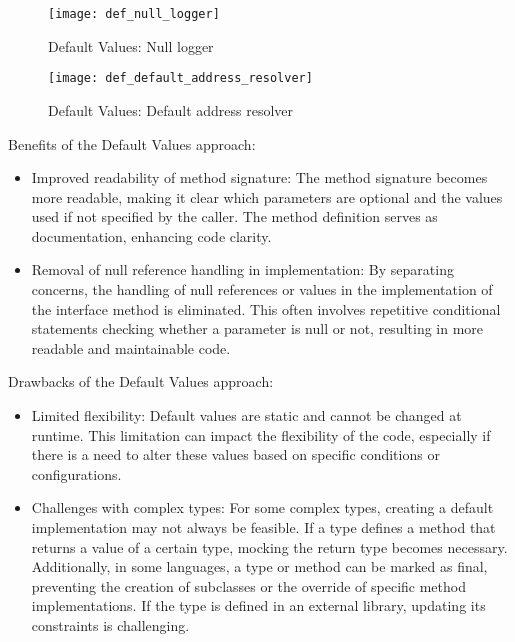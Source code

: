 \begin{figure}[!htb]
    \centering
    \texttt{[image: def\_null\_logger]}
    \caption{Default Values: Null logger}
    \label{fig:def_null_logger}
\end{figure}

\begin{figure}[!htb]
    \centering
    \texttt{[image: def\_default\_address\_resolver]}
    \caption{Default Values: Default address resolver}
    \label{fig:def_default_address_resolver}
\end{figure}

Benefits of the Default Values approach:

\begin{itemize}
    \item Improved readability of method signature:
    The method signature becomes more readable, making it clear which parameters are optional and the values
    used if not specified by the caller.
    The method definition serves as documentation, enhancing code clarity.
    \item Removal of null reference handling in implementation:
    By separating concerns, the handling of null references or values in the implementation of the interface method
    is eliminated.
    This often involves repetitive conditional statements checking whether a parameter is null or not,
    resulting in more readable and maintainable code.
\end{itemize}

Drawbacks of the Default Values approach:

\begin{itemize}
    \item Limited flexibility:
    Default values are static and cannot be changed at runtime.
    This limitation can impact the flexibility of the code, especially if there is a need to alter these values
    based on specific conditions or configurations.
    \item Challenges with complex types:
    For some complex types, creating a default implementation may not always be feasible.
    If a type defines a method that returns a value of a certain type, mocking the return type becomes necessary.
    Additionally, in some languages, a type or method can be marked as final, preventing the creation of subclasses
    or the override of specific method implementations.
    If the type is defined in an external library, updating its constraints is challenging.
\end{itemize}


